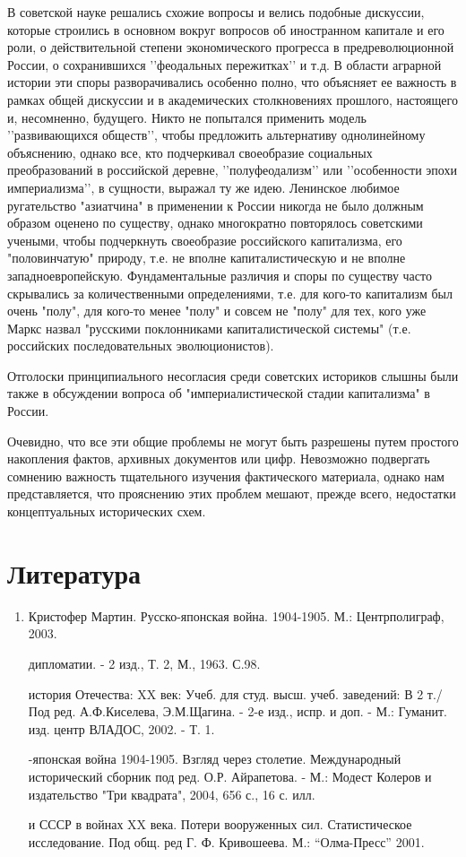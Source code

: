 \documentclass[12pt]{article}
\begin{document}
В советской науке решались схожие вопросы и велись подобные дискуссии, которые строились в основном вокруг вопросов об иностранном капитале и его роли, о действительной степени экономического прогресса в предреволюционной России, о сохранившихся \rq\rq{}феодальных пережитках\rq\rq{} и т.д. В области аграрной истории эти споры разворачивались особенно полно, что объясняет ее важность в рамках общей дискуссии и в академических столкновениях прошлого, настоящего и, несомненно, будущего. Никто не попытался применить модель \rq\rq{}развивающихся обществ\rq\rq{}, чтобы предложить альтернативу однолинейному объяснению, однако все, кто подчеркивал своеобразие социальных преобразований в российской деревне, \rq\rq{}полуфеодализм\rq\rq{} или \rq\rq{}особенности эпохи империализма\rq\rq{}, в сущности, выражал ту же идею. Ленинское любимое ругательство "азиатчина" в применении к России никогда не было должным образом оценено по существу, однако многократно повторялось советскими учеными, чтобы подчеркнуть своеобразие российского капитализма, его "половинчатую" природу, т.е. не вполне капиталистическую и не вполне западноевропейскую. Фундаментальные различия и споры по существу часто скрывались за количественными определениями, т.е. для кого-то капитализм был очень "полу", для кого-то менее "полу" и совсем не "полу" для тех, кого уже Маркс назвал "русскими поклонниками капиталистической системы" (т.е. российских последовательных эволюционистов).

Отголоски принципиального несогласия среди советских историков слышны были также в обсуждении вопроса об "империалистической стадии капитализма" в России.

Очевидно, что все эти общие проблемы не могут быть разрешены путем простого накопления фактов, архивных документов или цифр. Невозможно подвергать сомнению важность тщательного изучения фактического материала, однако нам представляется, что прояснению этих проблем мешают, прежде всего, недостатки концептуальных исторических схем.
\section* {Литература}
\begin {enumerate}

\item Кристофер Мартин. Русско-японская война. 1904-1905. М.: Центрполиграф, 2003.

 дипломатии. - 2 изд., Т. 2, М., 1963. С.98.

 история Отечества: XX век: Учеб. для студ. высш. учеб. заведений: В 2 т./Под ред. А.Ф.Киселева, Э.М.Щагина. - 2-е изд., испр. и доп. - М.: Гуманит. изд. центр ВЛАДОС, 2002. - Т. 1.

-японская война 1904-1905. Взгляд через столетие. Международный исторический сборник под ред. О.Р. Айрапетова. - М.: Модест Колеров и издательство "Три квадрата", 2004, 656 с., 16 с. илл.

 и СССР в войнах XX века. Потери вооруженных сил. Статистическое исследование. Под общ. ред Г. Ф. Кривошеева. М.: “Олма-Пресс” 2001.
\end {enumerate}
\end{document}
